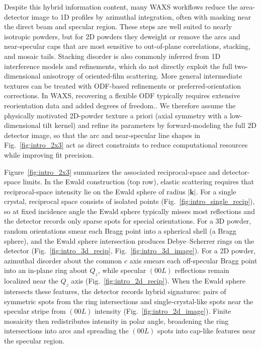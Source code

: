 Despite this hybrid information content, many WAXS workflows reduce the area-detector image to 1D profiles
by azimuthal integration, often with masking near the direct beam and specular region.\cite{Ashiotis2015,Hexemer2015,Strzalka2018,Reus2024,Savikhin2020}
These steps are well suited to nearly isotropic powders, but for 2D powders they deweight or remove the arcs
and near-specular caps that are most sensitive to out-of-plane correlations, stacking, and mosaic tails.\cite{SmilgiesBlasini2007,Hexemer2015}
Stacking disorder is also commonly inferred from 1D interference models and refinements,\cite{HendricksTeller1942,Treacy1991,CasasCabanas2016}
which do not directly exploit the full two-dimensional anisotropy of oriented-film scattering.
More general intermediate textures can be treated with ODF-based refinements or preferred-orientation corrections.\cite{March1932,Dollase1986,MatthiesVinel1982,Pawlik1986,VonDreele1997,LutterottiVasinWenk2014}
In WAXS, recovering a flexible ODF typically requires extensive reorientation data and added degrees of freedom..\cite{Sinha1988,Renaud2009}
We therefore assume the physically motivated 2D-powder texture a priori (axial symmetry with a low-dimensional
tilt kernel) and refine its parameters by forward-modeling the full 2D detector image, so that the arc and
near-specular line shapes in Fig.~\ref{fig:intro_2x3} act as direct constraints to reduce computational resources while improving fit precision.\cite{SmilgiesBlasini2007,Hexemer2015}

Figure~\ref{fig:intro_2x3} summarizes the associated reciprocal-space and detector-space limits. In the Ewald construction (top row), elastic scattering requires that reciprocal-space intensity lie on the Ewald sphere of radius $|\mathbf{k}|$.\cite{AlsNielsenMcMorrow2001}  For a single crystal, reciprocal space consists of isolated points (Fig.~\ref{fig:intro_single_recip}), so at fixed incidence angle the Ewald sphere typically misses most reflections and the detector records only sparse spots for special orientations.\cite{AlsNielsenMcMorrow2001} For a 3D powder, random orientations smear each Bragg point into a spherical shell (a Bragg sphere), and the Ewald sphere intersection produces Debye--Scherrer rings on the detector (Fig.~\ref{fig:intro_3d_recip}, Fig.~\ref{fig:intro_3d_image}).\cite{AlsNielsenMcMorrow2001} For a 2D powder, azimuthal disorder about the common \(c\) axis smears each off-specular
Bragg point into an in-plane ring about \(Q_z\), while specular \((00L)\) reflections remain
localized near the \(Q_z\) axis (Fig.~\ref{fig:intro_2d_recip}).\cite{Kaganer1999,SmilgiesBlasini2007}
When the Ewald sphere intersects these features, the detector records hybrid signatures:
pairs of symmetric spots from the ring intersections and single-crystal-like spots near the
specular stripe from \((00L)\) intensity (Fig.~\ref{fig:intro_2d_image}).\cite{SmilgiesBlasini2007,Hexemer2015,Smilgies2005Rods}
Finite mosaicity then redistributes intensity in polar angle, broadening the ring intersections into
arcs and spreading the \((00L)\) spots into cap-like features near the specular region.\cite{Kaganer1999,SmilgiesBlasini2007}



